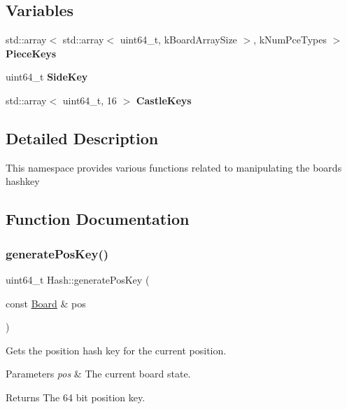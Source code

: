 \subsection*{Variables}
\begin{DoxyCompactItemize}
\item 
\mbox{\label{namespaceHash_aff162a90408333f82a32806c4792a88d}} 
std\+::array$<$ std\+::array$<$ uint64\+\_\+t, k\+Board\+Array\+Size $>$, k\+Num\+Pce\+Types $>$ {\bfseries Piece\+Keys}
\item 
\mbox{\label{namespaceHash_a5ed567a4d8542636dde31ae4f3d95e28}} 
uint64\+\_\+t {\bfseries Side\+Key}
\item 
\mbox{\label{namespaceHash_a961bf38be4a9f19f3fb39cb731cefadb}} 
std\+::array$<$ uint64\+\_\+t, 16 $>$ {\bfseries Castle\+Keys}
\end{DoxyCompactItemize}


\subsection{Detailed Description}
This namespace provides various functions related to manipulating the board\textquotesingle{}s hashkey 

\subsection{Function Documentation}
\mbox{\label{namespaceHash_ac97f6604fcb1ad14616b2617e6bae967}} 
\subsubsection{\texorpdfstring{generate\+Pos\+Key()}{generatePosKey()}}
{\footnotesize\ttfamily uint64\+\_\+t Hash\+::generate\+Pos\+Key (\begin{DoxyParamCaption}\item[{const \mbox{\hyperlink{classBoard}{Board}} \&}]{pos }\end{DoxyParamCaption})}



Gets the position hash key for the current position. 


\begin{DoxyParams}{Parameters}
{\em pos} & The current board state. \\
\hline
\end{DoxyParams}
\begin{DoxyReturn}{Returns}
The 64 bit position key. 
\end{DoxyReturn}


